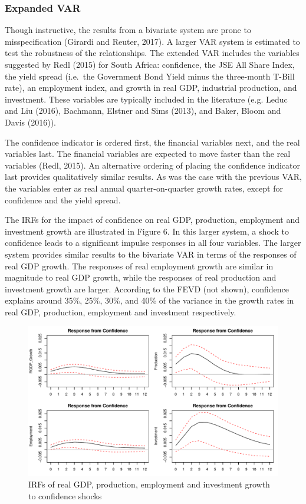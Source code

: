 \documentclass[11pt,]{article}
\begin{document}
\subsubsection{Expanded VAR}\label{expanded-var}

Though instructive, the results from a bivariate system are prone to
misspecification (Girardi and Reuter, 2017). A larger VAR system is
estimated to test the robustness of the relationships. The extended VAR
includes the variables suggested by Redl (2015) for South Africa:
confidence, the JSE All Share Index, the yield spread (i.e.~the
Government Bond Yield minus the three-month T-Bill rate), an employment
index, and growth in real GDP, industrial production, and investment.
These variables are typically included in the literature (e.g. Leduc and
Liu (2016), Bachmann, Elstner and Sims (2013), and Baker, Bloom and
Davis (2016)).

The confidence indicator is ordered first, the financial variables next,
and the real variables last. The financial variables are expected to
move faster than the real variables (Redl, 2015). An alternative
ordering of placing the confidence indicator last provides qualitatively
similar results. As was the case with the previous VAR, the variables
enter as real annual quarter-on-quarter growth rates, except for
confidence and the yield spread.

The IRFs for the impact of confidence on real GDP, production,
employment and investment growth are illustrated in Figure 6. In this
larger system, a shock to confidence leads to a significant impulse
responses in all four variables. The larger system provides similar
results to the bivariate VAR in terms of the responses of real GDP
growth. The responses of real employment growth are similar in magnitude
to real GDP growth, while the responses of real production and
investment growth are larger. According to the FEVD (not shown),
confidence explains around 35\%, 25\%, 30\%, and 40\% of the variance in
the growth rates in real GDP, production, employment and investment
respectively.

\begin{figure}
\centering
\includegraphics{BCon_5_Journal_files/figure-latex/figure6-1.pdf}
\caption{IRFs of real GDP, production, employment and investment growth
to confidence shocks}
\end{figure}
\end{document}
